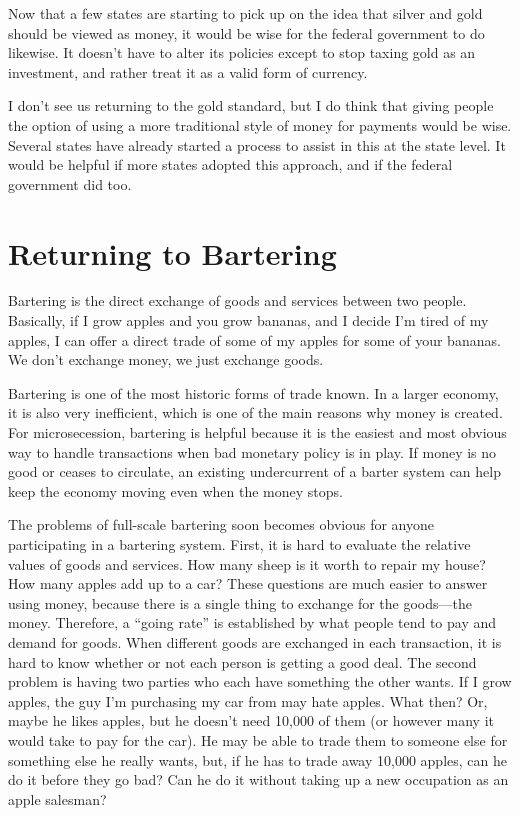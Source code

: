\begin{policynote}
Now that a few states are starting to pick up on the idea that silver
and gold should be viewed as money, it would be wise for the federal
government to do likewise. It doesn’t have to alter its policies except
to stop taxing gold as an investment, and rather treat it as a valid
form of currency.

I don’t see us returning to the gold standard, but I do think that
giving people the option of using a more traditional style of money for
payments would be wise. Several states have already started a process
to assist in this at the state level. It would be helpful if more
states adopted this approach, and if the federal government did too.
\end{policynote}

\section{Returning to Bartering}

Bartering is the direct exchange of goods and services between two people.
Basically, if I grow apples and you grow bananas, and I decide I'm tired
of my apples, I can offer a direct trade of some of my apples for some
of your bananas.  We don't exchange money, we just exchange goods.

Bartering is one of the most historic forms of trade known.  In a 
larger economy, it is also very inefficient, which is one of the 
main reasons why money is created.  For microsecession, bartering
is helpful because it is the easiest and most obvious way to 
handle transactions when bad monetary policy is in play.  If money 
is no good or ceases to circulate, an existing undercurrent of a barter
system can help keep the economy moving even when the money stops.

The problems of full-scale bartering soon becomes obvious for anyone participating
in a bartering system.  First, it is hard to evaluate the relative values
of goods and services.  How many sheep is it worth to repair my house?
How many apples add up to a car?  These questions are much easier to answer
using money, because there is a single thing to exchange for the goods---the money.
Therefore, a ``going rate'' is established by what people tend to pay
and demand for goods.  When different goods are exchanged in each transaction,
it is hard to know whether or not each person is getting a good deal.
The second problem is having two parties who each have something the other wants.
If I grow apples, the guy I'm purchasing my car from may hate apples.  What then?
Or, maybe he likes apples, but he doesn't need 10,000 of them (or however many it would
take to pay for the car).  He may be able to trade them to someone else for something
else he really wants, but, if he has to trade away 10,000 apples, can he do it 
before they go bad?  Can he do it without taking up a new occupation as an apple
salesman?

